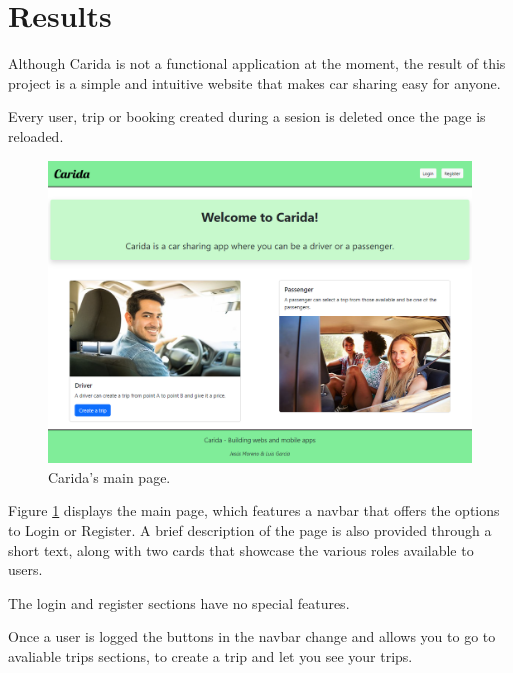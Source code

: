 \documentclass{article}
\begin{document}
  \section{Results}\label{sec:results}
    
  Although Carida is not a functional application at the moment, the result of this project is a simple and intuitive website that makes car sharing easy for anyone.

  Every user, trip or booking created during a sesion is deleted once the page is reloaded.

  \begin{figure}[h]
    \centering
    \includegraphics[width=1\columnwidth]{figures/Main page.png}
    \caption{Carida's main page.\label{fig:main page.png}}
    \end{figure}

    Figure \ref{fig:main page.png} displays the main page, which features a navbar that offers the options to Login or Register. A brief description of the page is also provided through a short text, along with two cards that showcase the various roles available to users.

    The login and register sections have no special features.

    Once a user is logged the buttons in the navbar change and allows you to go to avaliable trips sections, to create a trip and let you see your trips.
\end{document}
